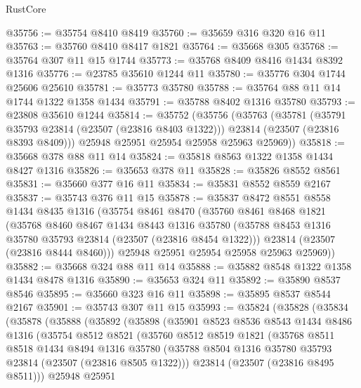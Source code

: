 \begin{lexlean}{RustCore}
\begin{coremodule}
@35756 := @35754 @8410 @8419
@35760 := @35659 @316 @320 @16 @11
@35763 := @35760 @8410 @8417 @1821
@35764 := @35668 @305
@35768 := @35764 @307 @11 @15 @1744
@35773 := @35768 @8409 @8416 @1434 @8392 @1316
@35776 := @23785 @35610 @1244 @11
@35780 := @35776 @304 @1744 @25606 @25610
@35781 := @35773 @35780
@35788 := @35764 @88 @11 @14 @1744 @1322 @1358 @1434
@35791 := @35788 @8402 @1316 @35780
@35793 := @23808 @35610 @1244
@35814 := @35752
    (@35756
      (@35763
        (@35781
          (@35791 @35793 @23814 (@23507 (@23816 @8403 @1322)))
          @23814
          (@23507 (@23816 @8393 @8409)))
        @25948
        @25951
        @25954
        @25958
        @25963
        @25969))
@35818 := @35668 @378 @88 @11 @14
@35824 := @35818 @8563 @1322 @1358 @1434 @8427 @1316
@35826 := @35653 @378 @11
@35828 := @35826 @8552 @8561
@35831 := @35660 @377 @16 @11
@35834 := @35831 @8552 @8559 @2167
@35837 := @35743 @376 @11 @15
@35878 := @35837
    @8472
    @8551
    @8558
    @1434
    @8435
    @1316
    (@35754
      @8461
      @8470
      (@35760
        @8461
        @8468
        @1821
        (@35768
          @8460
          @8467
          @1434
          @8443
          @1316
          @35780
          (@35788 @8453 @1316 @35780 @35793 @23814 (@23507 (@23816 @8454 @1322)))
          @23814
          (@23507 (@23816 @8444 @8460)))
        @25948
        @25951
        @25954
        @25958
        @25963
        @25969))
@35882 := @35668 @324 @88 @11 @14
@35888 := @35882 @8548 @1322 @1358 @1434 @8478 @1316
@35890 := @35653 @324 @11
@35892 := @35890 @8537 @8546
@35895 := @35660 @323 @16 @11
@35898 := @35895 @8537 @8544 @2167
@35901 := @35743 @307 @11 @15
@35993 := @35824
    (@35828
      (@35834
        (@35878
          (@35888
            (@35892
              (@35898
                (@35901
                  @8523
                  @8536
                  @8543
                  @1434
                  @8486
                  @1316
                  (@35754
                    @8512
                    @8521
                    (@35760
                      @8512
                      @8519
                      @1821
                      (@35768
                        @8511
                        @8518
                        @1434
                        @8494
                        @1316
                        @35780
                        (@35788 @8504 @1316 @35780 @35793 @23814 (@23507 (@23816 @8505 @1322)))
                        @23814
                        (@23507 (@23816 @8495 @8511)))
                      @25948
                      @25951

\end{coremodule}
\end{lexlean}
